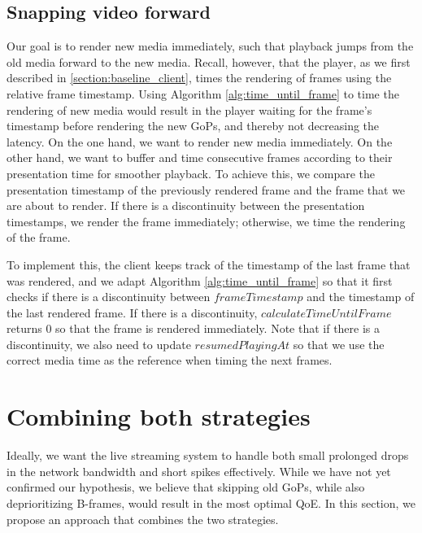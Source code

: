 \subsection{Snapping video forward}\label{section:snapping_video_forward}
Our goal is to render new media immediately, such that playback jumps from the old media forward to the new media. Recall, however, that the player, as we first described in \autoref{section:baseline_client}, times the rendering of frames using the relative frame timestamp. Using Algorithm \ref{alg:time_until_frame} to time the rendering of new media would result in the player waiting for the frame's timestamp before rendering the new GoPs, and thereby not decreasing the latency. On the one hand, we want to render new media immediately. On the other hand, we want to buffer and time consecutive frames according to their presentation time for smoother playback. To achieve this, we compare the presentation timestamp of the previously rendered frame and the frame that we are about to render. If there is a discontinuity between the presentation timestamps, we render the frame immediately; otherwise, we time the rendering of the frame.

To implement this, the client keeps track of the timestamp of the last frame that was rendered, and we adapt Algorithm \ref{alg:time_until_frame} so that it first checks if there is a discontinuity between $frameTimestamp$ and the timestamp of the last rendered frame. If there is a discontinuity, $calculateTimeUntilFrame$ returns 0 so that the frame is rendered immediately. Note that if there is a discontinuity, we also need to update $resumedPlayingAt$ so that we use the correct media time as the reference when timing the next frames.


\section{Combining both strategies}
Ideally, we want the live streaming system to handle both small prolonged drops in the network bandwidth and short spikes effectively. While we have not yet confirmed our hypothesis, we believe that skipping old \acp{GoP}, while also deprioritizing B-frames, would result in the most optimal \ac{QoE}. In this section, we propose an approach that combines the two strategies.

